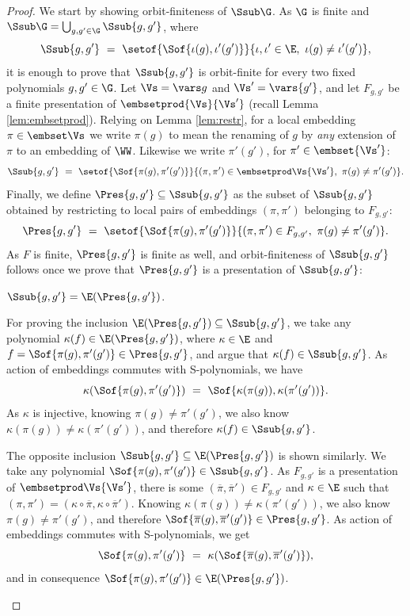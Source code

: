 \begin{proof}
We start by showing orbit-finiteness of $\Ssub\G$.
As $\G$ is finite and $\Ssub \G = \bigcup_{g,g'\in\G} \Ssub {g,g'}$, where
\[
\Ssub {g,g'} \ = \  \setof{\Sof{\iota(g),\iota'(g')}}{\iota, \iota' \in \E, \ \iota(g)\neq\iota'(g')},
\]
it is enough to prove that $\Ssub {g,g'}$ is orbit-finite for every two fixed polynomials $g,g'\in\G$.
Let $\Vs = \vars g$ and $\Vs' = \vars {g'}$, and
let $F_{g,g'}$ be a finite presentation of $\embsetprod {\Vs} {\Vs'}$
(recall Lemma \ref{lem:embsetprod}).
Relying on Lemma \ref{lem:restr},
for a local embedding $\pi\in\embset\Vs$ we write $\pi(g)$ to mean the renaming of $g$
by \emph{any} extension of $\pi$ to an embedding of $\WW$.
Likewise we write $\pi'(g')$, for $\pi'\in\embset{\Vs'}$:
\[
\Ssub {g,g'} \ = \  \setof{\Sof{\pi(g),\pi'(g')}}{(\pi, \pi') \in \embsetprod \Vs {\Vs'}, \ \pi(g)\neq\pi'(g')}.
\]
Finally, we define $\Pres{g,g'}\subseteq \Ssub {g,g'}$ as the subset of $\Ssub {g,g'}$ obtained by restricting 
to local pairs of embeddings $(\pi, \pi')$ belonging to $F_{g,g'}$:
\[
\Pres{g,g'} \ = \ \setof{\Sof {\pi(g), \pi'(g')}}{(\pi,\pi') \in F_{g,g'}, \ \pi(g)\neq\pi'(g')}.
\]
As $F$ is finite, $\Pres{g,g'}$ is finite as well, 
and orbit-finiteness of $\Ssub {g,g'}$ follows once we prove that
$\Pres{g,g'}$ is a presentation of $\Ssub{g,g'}$:
%
\begin{claim}
$\Ssub {g,g'} = \E(\Pres{g,g'})$.
\end{claim}
\begin{claimproofnew}
For proving the inclusion
$\E(\Pres{g,g'}) \subseteq \Ssub {g,g'}$,
we take any polynomial $\kappa(f)\in \E(\Pres{g,g'})$, where $\kappa \in \E$ and $f = \Sof {\pi(g), \pi'(g')} \in \Pres{g,g'}$,
and argue that $\kappa(f) \in \Ssub {g,g'}$.
As action of embeddings commutes with S-polynomials, 
we have
\[
\kappa(\Sof {\pi(g), \pi'(g')}) \ = \ \Sof {\kappa(\pi(g)), \kappa(\pi'(g'))}.
\]
As $\kappa$ is injective, 
knowing $\pi(g)\neq\pi'(g')$, we also know $\kappa(\pi(g))\neq\kappa(\pi'(g'))$,
and therefore $\kappa(f) \in \Ssub {g,g'}$.

The opposite inclusion $\Ssub {g,g'} \subseteq \E(\Pres{g,g'})$ is shown similarly.
We take any polynomial $\Sof {\pi(g), \pi'(g')} \in \Ssub {g,g'}$.
As $F_{g,g'}$ is a presentation of $\embsetprod \Vs{\Vs'}$, there is some 
$(\overline\pi, \overline\pi')\in F_{g,g'}$ and
$\kappa\in\E$ such that
$(\pi,\pi') = (\kappa\circ\overline\pi, \kappa\circ\overline\pi')$.
Knowing $\kappa(\pi(g))\neq\kappa(\pi'(g'))$, we also know $\pi(g)\neq\pi'(g')$,
and therefore $\Sof {\overline\pi(g), \overline\pi'(g')} \in \Pres{g,g'}$.
As action of embeddings commutes with S-polynomials, we get
\[
\Sof {\pi(g), \pi'(g')} \ = \ 
\kappa(\Sof {\overline\pi(g), \overline\pi'(g')}),
\]
and in consequence $\Sof {\pi(g), \pi'(g')}\in\E(\Pres{g,g'})$.
\end{claimproofnew}


\end{proof}
